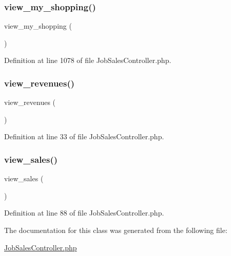 \subsubsection{\texorpdfstring{view\_my\_shopping()}{view\_my\_shopping()}}
{\footnotesize\ttfamily view\+\_\+my\+\_\+shopping (\begin{DoxyParamCaption}{ }\end{DoxyParamCaption})}



Definition at line 1078 of file Job\+Sales\+Controller.\+php.

\mbox{\label{class_responsive_1_1_http_1_1_controllers_1_1_job_sales_controller_a6ab40143e21a521f539feafe14307097}} 
\subsubsection{\texorpdfstring{view\_revenues()}{view\_revenues()}}
{\footnotesize\ttfamily view\+\_\+revenues (\begin{DoxyParamCaption}{ }\end{DoxyParamCaption})}



Definition at line 33 of file Job\+Sales\+Controller.\+php.

\mbox{\label{class_responsive_1_1_http_1_1_controllers_1_1_job_sales_controller_a9c4ccb19926f4a518484fd42bb345272}} 
\subsubsection{\texorpdfstring{view\_sales()}{view\_sales()}}
{\footnotesize\ttfamily view\+\_\+sales (\begin{DoxyParamCaption}{ }\end{DoxyParamCaption})}



Definition at line 88 of file Job\+Sales\+Controller.\+php.



The documentation for this class was generated from the following file\+:\begin{DoxyCompactItemize}
\item 
\mbox{\hyperlink{_job_sales_controller_8php}{Job\+Sales\+Controller.\+php}}\end{DoxyCompactItemize}
